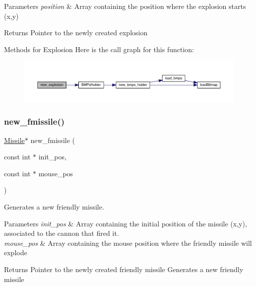 \begin{DoxyParams}{Parameters}
{\em position} & Array containing the position where the explosion starts (x,y)\\
\hline
\end{DoxyParams}
\begin{DoxyReturn}{Returns}
Pointer to the newly created explosion
\end{DoxyReturn}
Methods for Explosion Here is the call graph for this function\+:\nopagebreak
\begin{figure}[H]
\begin{center}
\leavevmode
\includegraphics[width=350pt]{group___missile_ga26a5cb6dc4144b31bb2005e4b587ff4f_cgraph}
\end{center}
\end{figure}
\hypertarget{group___missile_ga163468dc0fdc7c61c009528ed5099753}{}\label{group___missile_ga163468dc0fdc7c61c009528ed5099753} 
\subsubsection{\texorpdfstring{new\+\_\+fmissile()}{new\_fmissile()}}
{\footnotesize\ttfamily \hyperlink{group___missile_ga7ea98f7c879356e5dfa41934529d86e1}{Missile}$\ast$ new\+\_\+fmissile (\begin{DoxyParamCaption}\item[{const int $\ast$}]{init\+\_\+pos,  }\item[{const int $\ast$}]{mouse\+\_\+pos }\end{DoxyParamCaption})}



Generates a new friendly missile. 


\begin{DoxyParams}{Parameters}
{\em init\+\_\+pos} & Array containing the initial position of the missile (x,y), associated to the cannon that fired it. \\
\hline
{\em mouse\+\_\+pos} & Array containing the mouse position where the friendly missile will explode\\
\hline
\end{DoxyParams}
\begin{DoxyReturn}{Returns}
Pointer to the newly created friendly missile Generates a new friendly missile
\end{DoxyReturn}


